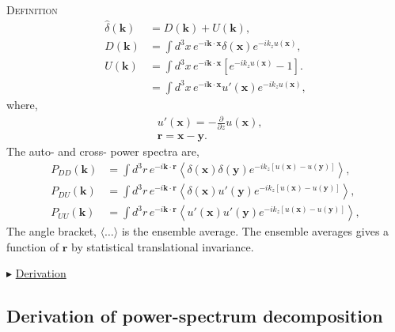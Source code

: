 \documentclass[a4paper,11pt, fleqn]{article}
\begin{document}
\vspace{5mm}
\textsc{Definition}
\vspace{-2mm}
\begin{align}
  \hat{\delta}(\bm{k}) &= D(\bm{k}) + U(\bm{k}),\\
  D(\bm{k}) &= \int \! d^3 x \, e^{-i\bm{k}\cdot\bm{x}} \delta(\bm{x})
                                e^{-ik_z u(\bm{x})},\\
  \label{eq:U}
  U(\bm{k}) &= \int \! d^3 x \, e^{-i\bm{k}\cdot\bm{x}}
                             \left[ e^{-ik_z u(\bm{x})} - 1 \right].\\
            &=   \int\! d^3 x \, e^{-i \bm{k}\cdot\bm{x}}
              u'(\bm{x}) e^{-ik_z u(\bm{x})},
\end{align}
%
where,
\begin{align}
  &u'(\bm{x}) = - \frac{\partial}{\partial z} u(\bm{x}),\\
  &\bm{r}     = \bm{x} - \bm{y}.
\end{align}
%
The auto- and cross- power spectra are,
%
\begin{align}
  P_{DD}(\bm{k}) &=
  \int\! d^3 r \, e^{-i \bm{k}\cdot\bm{r}}
  \left\langle
    \delta(\bm{x}) \delta(\bm{y}) e^{-ik_z [u(\bm{x}) - u(\bm{y})]}
    \right\rangle,\\
  P_{DU}(\bm{k}) &=
  \int\! d^3 r \, e^{-i \bm{k}\cdot\bm{r}}
  \left\langle
    \delta(\bm{x}) u'(\bm{y}) e^{-ik_z [u(\bm{x}) - u(\bm{y})]}
    \right\rangle,\\
  P_{UU}(\bm{k}) &=
  \int\! d^3 r \, e^{-i \bm{k}\cdot\bm{r}}
  \left\langle
    u'(\bm{x}) u'(\bm{y}) e^{-ik_z [u(\bm{x}) - u(\bm{y})]}
    \right\rangle,
\end{align}
%
The angle bracket, $\langle\dots\rangle$ is the ensemble average. The
ensemble averages gives a function of $\bm{r}$ by statistical
translational invariance.

\vspace{10mm}
$\blacktriangleright$ \hyperlink{sec:decomposed-power-derivation}{Derivation}

%
\newpage
\subsection{Derivation of power-spectrum decomposition}
\label{sec:decomposed-power-derivation}\quad\\
\end{document}
